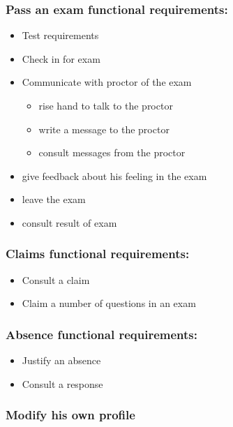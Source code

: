 \documentclass[a4paper,12p]{article}
\begin{document}
     \subsubsection{Pass an exam functional requirements:}
     \begin{itemize}
         \item Test requirements
         \item Check in for exam

         \item{Communicate with proctor of the exam}
         \begin{itemize}
             \item rise hand to talk to the proctor
             \item write a message to the proctor
             \item consult messages from the proctor
         \end{itemize}

         \item give feedback about his feeling in the exam
         \item leave the exam
         \item consult result of exam
     \end{itemize}

     \subsubsection{Claims functional requirements:}
     \begin{itemize}
         \item Consult a claim
         \item Claim a number of questions in an exam
     \end{itemize}

     \subsubsection{Absence functional requirements:}
     \begin{itemize}
         \item Justify an absence
         \item Consult a response
     \end{itemize}

     \subsubsection{Modify his own profile}
\end{document}
